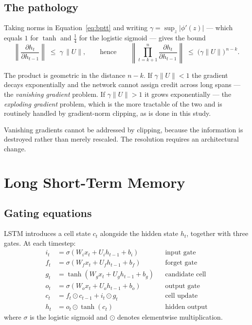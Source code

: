 \subsection{The pathology}

Taking norms in Equation~\ref{eq:bptt} and writing $\gamma = \sup_z |\phi'(z)|$ --- which equals
$1$ for $\tanh$ and $\tfrac{1}{4}$ for the logistic sigmoid --- gives the bound
\begin{equation}
\left\| \frac{\partial h_t}{\partial h_{t-1}} \right\| \;\le\; \gamma \, \|U\| ,
\qquad\text{hence}\qquad
\left\| \prod_{t=k+1}^{n} \frac{\partial h_t}{\partial h_{t-1}} \right\|
  \;\le\; \big(\gamma \|U\|\big)^{\,n-k} .
\label{eq:vanish}
\end{equation}

The product is geometric in the distance $n-k$. If $\gamma\|U\| < 1$ the gradient decays
exponentially and the network cannot assign credit across long spans --- the \emph{vanishing
gradient} problem. If $\gamma\|U\| > 1$ it grows exponentially --- the \emph{exploding gradient}
problem, which is the more tractable of the two and is routinely handled by gradient-norm
clipping, as is done in this study.

Vanishing gradients cannot be addressed by clipping, because the information is destroyed rather
than merely rescaled. The resolution requires an architectural change.

\section{Long Short-Term Memory}

\subsection{Gating equations}

LSTM introduces a cell state $c_t$ alongside the hidden state $h_t$, together with three gates. At
each timestep:
\begin{align}
i_t &= \sigma\!\left(W_i x_t + U_i h_{t-1} + b_i\right) && \text{input gate} \label{eq:lstm_i}\\
f_t &= \sigma\!\left(W_f x_t + U_f h_{t-1} + b_f\right) && \text{forget gate} \label{eq:lstm_f}\\
g_t &= \tanh\!\left(W_g x_t + U_g h_{t-1} + b_g\right) && \text{candidate cell} \label{eq:lstm_g}\\
o_t &= \sigma\!\left(W_o x_t + U_o h_{t-1} + b_o\right) && \text{output gate} \label{eq:lstm_o}\\
c_t &= f_t \odot c_{t-1} + i_t \odot g_t && \text{cell update} \label{eq:lstm_c}\\
h_t &= o_t \odot \tanh(c_t) && \text{hidden output} \label{eq:lstm_h}
\end{align}
where $\sigma$ is the logistic sigmoid and $\odot$ denotes elementwise multiplication.

